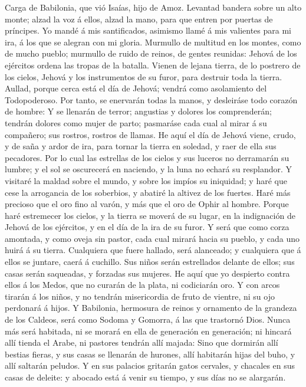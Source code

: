  Carga de Babilonia, que vió Isaías, hijo de Amoz.
 Levantad bandera sobre un alto monte; alzad la voz á ellos,
alzad la mano, para que entren por puertas de príncipes.  Yo
mandé á mis santificados, asimismo llamé á mis valientes para mi ira, á
los que se alegran con mi gloria.  Murmullo de multitud en
los montes, como de mucho pueblo; murmullo de ruido de reinos, de gentes
reunidas: Jehová de los ejércitos ordena las tropas de la batalla.
 Vienen de lejana tierra, de lo postrero de los cielos,
Jehová y los instrumentos de su furor, para destruir toda la tierra.
 Aullad, porque cerca está el día de Jehová; vendrá como
asolamiento del Todopoderoso.  Por tanto, se enervarán todas
la manos, y desleiráse todo corazón de hombre:  Y se
llenarán de terror; angustias y dolores los comprenderán; tendrán
dolores como mujer de parto; pasmaráse cada cual al mirar á su
compañero; sus rostros, rostros de llamas.  He aquí el día
de Jehová viene, crudo, y de saña y ardor de ira, para tornar la tierra
en soledad, y raer de ella sus pecadores.  Por lo cual las
estrellas de los cielos y sus luceros no derramarán su lumbre; y el sol
se oscurecerá en naciendo, y la luna no echará su resplandor.
 Y visitaré la maldad sobre el mundo, y sobre los impíos su
iniquidad; y haré que cese la arrogancia de los soberbios, y abatiré la
altivez de los fuertes.  Haré más precioso que el oro fino
al varón, y más que el oro de Ophir al hombre.  Porque haré
estremecer los cielos, y la tierra se moverá de su lugar, en la
indignación de Jehová de los ejércitos, y en el día de la ira de su
furor.  Y será que como corza amontada, y como oveja sin
pastor, cada cual mirará hacia su pueblo, y cada uno huirá á su tierra.
 Cualquiera que fuere hallado, será alanceado; y cualquiera
que á ellos se juntare, caerá á cuchillo.  Sus niños serán
estrellados delante de ellos; sus casas serán saqueadas, y forzadas sus
mujeres.  He aquí que yo despierto contra ellos á los
Medos, que no curarán de la plata, ni codiciarán oro.  Y
con arcos tirarán á los niños, y no tendrán misericordia de fruto de
vientre, ni su ojo perdonará á hijos.  Y Babilonia,
hermosura de reinos y ornamento de la grandeza de los Caldeos, será como
Sodoma y Gomorra, á las que trastornó Dios.  Nunca más será
habitada, ni se morará en ella de generación en generación; ni hincará
allí tienda el Arabe, ni pastores tendrán allí majada: 
Sino que dormirán allí bestias fieras, y sus casas se llenarán de
hurones, allí habitarán hijas del buho, y allí saltarán peludos.
 Y en sus palacios gritarán gatos cervales, y chacales en
sus casas de deleite: y abocado está á venir su tiempo, y sus días no se
alargarán.

